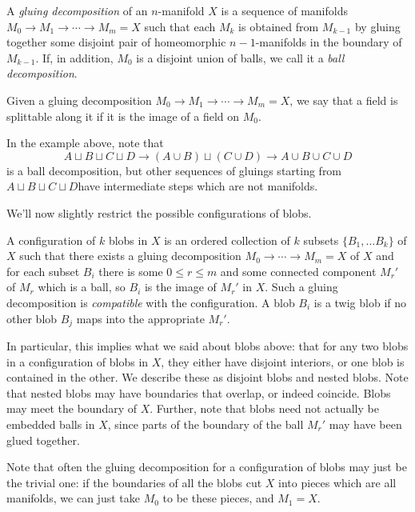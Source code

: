\begin{defn}
\label{defn:gluing-decomposition}
A \emph{gluing decomposition} of an $n$-manifold $X$ is a sequence of manifolds 
$M_0 \to M_1 \to \cdots \to M_m = X$ such that each $M_k$ is obtained from $M_{k-1}$ 
by gluing together some disjoint pair of homeomorphic $n{-}1$-manifolds in the boundary of $M_{k-1}$.
If, in addition, $M_0$ is a disjoint union of balls, we call it a \emph{ball decomposition}.
\end{defn}
Given a gluing decomposition $M_0 \to M_1 \to \cdots \to M_m = X$, we say that a field is splittable along it if it is the image of a field on $M_0$.

In the example above, note that $$A \sqcup B \sqcup C \sqcup D \to (A \cup B) \sqcup (C \cup D) \to A \cup B \cup C \cup D$$ is a  ball decomposition, but other sequences of gluings starting from $A \sqcup B \sqcup C \sqcup D$have intermediate steps which are not manifolds.

We'll now slightly restrict the possible configurations of blobs.
\begin{defn}
\label{defn:configuration}
A configuration of $k$ blobs in $X$ is an ordered collection of $k$ subsets $\{B_1, \ldots B_k\}$ of $X$ such that there exists a gluing decomposition $M_0  \to \cdots \to M_m = X$ of $X$ and for each subset $B_i$ there is some $0 \leq r \leq m$ and some connected component $M_r'$ of $M_r$ which is a ball, so $B_i$ is the image of $M_r'$ in $X$. Such a gluing decomposition is \emph{compatible} with the configuration. A blob $B_i$ is a twig blob if no other blob $B_j$ maps into the appropriate $M_r'$. 
\end{defn}
In particular, this implies what we said about blobs above: 
that for any two blobs in a configuration of blobs in $X$, 
they either have disjoint interiors, or one blob is contained in the other. 
We describe these as disjoint blobs and nested blobs. 
Note that nested blobs may have boundaries that overlap, or indeed coincide. 
Blobs may meet the boundary of $X$.
Further, note that blobs need not actually be embedded balls in $X$, since parts of the boundary of the ball $M_r'$ may have been glued together.

Note that often the gluing decomposition for a configuration of blobs may just be the trivial one: if the boundaries of all the blobs cut $X$ into pieces which are all manifolds, we can just take $M_0$ to be these pieces, and $M_1 = X$.

